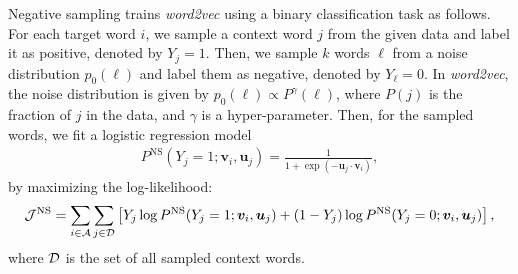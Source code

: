 \documentclass[12pt,a4paper]{article}
\newcommand{\vect}[1]{\boldsymbol{#1}}
\begin{document}
Negative sampling trains {\it word2vec} using a binary classification task as follows.
For each target word $i$, we sample a context word $j$ from the given data and label it as positive, denoted by $Y_{j}=1$.
Then, we sample $k$ words $\ell$ from a noise distribution $p_0(\ell)$ and label them as negative, denoted by $Y_{\ell}=0$.
In \textit{word2vec}, the noise distribution is given by $p_0(\ell) \propto P^\gamma (\ell)$, where $P(j)$ is the fraction of $j$ in the data, and $\gamma$ is a hyper-parameter.
Then, for the sampled words, we fit a logistic regression model
\begin{align}
	\label{eq:logistic-regress}
	P^{\text{NS}}(Y_{j} = 1; \vect{v}_{i}, \vect{u}_j) = \frac{1}{1 + \exp(-\vect{u}_j \cdot \vect{v}_{i})},
\end{align}
by maximizing the log-likelihood:
\begin{align}
	\label{eq:log-likelihood-logistic-regress}
	{\cal J}^{\text{NS}} = \sum_{i \in {\cal A}} \sum_{j \in {\cal D}} \left[ Y_{j} \log P^{\text{NS}}(Y_{j} = 1; \vect{v}_{i}, \vect{u}_j) + (1-Y_{j}) \log P^{\text{NS}}(Y_{j} = 0; \vect{v}_{i}, \vect{u}_j)\right],
\end{align}
where ${\cal D}$ is the set of all sampled context words.
\end{document}
